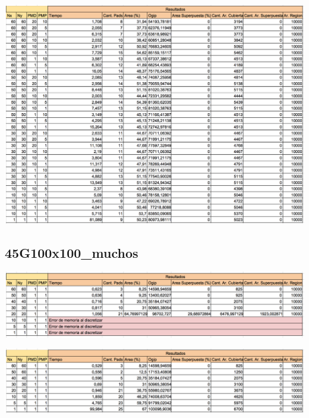 \begin{center}
\includegraphics[width=1\textwidth]{imagenes/GML_45G100x100_pocos}
\end{center}

\subsection{45G100x100\_muchos}

\begin{center}
\includegraphics[width=1\textwidth]{imagenes/S_45G100x100_muchos}
\end{center}

\begin{center}
\includegraphics[width=1\textwidth]{imagenes/G_45G100x100_muchos}
\end{center}

